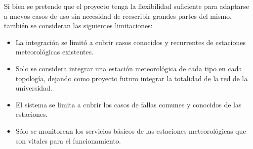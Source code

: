 Si bien se pretende que el proyecto tenga la flexibilidad suficiente para adaptarse a nuevos casos de uso sin necesidad  de reescribir grandes partes del mismo, también se consideran las siguientes limitaciones:

\begin{itemize}

\item La integración se limitó a cubrir casos conocidos y recurrentes de estaciones meteorológicas existentes.
\item Solo se considera integrar una estación meteorológica de cada tipo en cada topología, dejando como proyecto futuro integrar la totalidad de la red de la universidad.
\item El sistema se limita a cubrir los casos de fallas comunes y conocidos de las estaciones.
\item Sólo se monitorean los servicios básicos de las estaciones meteorológicas que son vitales para el funcionamiento.
\end{itemize}
